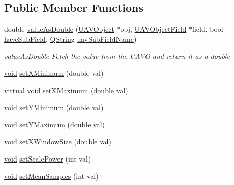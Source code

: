 \subsection*{\-Public \-Member \-Functions}
\begin{DoxyCompactItemize}
\item 
double \hyperlink{group___scope_plugin_ga7a54fec6758e8641d8baaefca4deddc9}{value\-As\-Double} (\hyperlink{class_u_a_v_object}{\-U\-A\-V\-Object} $\ast$obj, \hyperlink{class_u_a_v_object_field}{\-U\-A\-V\-Object\-Field} $\ast$field, bool \hyperlink{group___scope_plugin_ga75814d7f770a1a8348f39dc7ca4bdb8f}{have\-Sub\-Field}, \hyperlink{group___u_a_v_objects_plugin_gab9d252f49c333c94a72f97ce3105a32d}{\-Q\-String} \hyperlink{group___scope_plugin_ga22ac4a688fa35def44e941b82b0a0b60}{uav\-Sub\-Field\-Name})
\begin{DoxyCompactList}\small\item\em value\-As\-Double \-Fetch the value from the \-U\-A\-V\-O and return it as a double \end{DoxyCompactList}\item 
\hyperlink{group___u_a_v_objects_plugin_ga444cf2ff3f0ecbe028adce838d373f5c}{void} \hyperlink{group___scope_plugin_ga8352ce6b7eb9118afa04e021fbba40cc}{set\-X\-Minimum} (double val)
\item 
virtual \hyperlink{group___u_a_v_objects_plugin_ga444cf2ff3f0ecbe028adce838d373f5c}{void} \hyperlink{group___scope_plugin_ga3f195254ad44f888d45d763d819d4341}{set\-X\-Maximum} (double val)
\item 
\hyperlink{group___u_a_v_objects_plugin_ga444cf2ff3f0ecbe028adce838d373f5c}{void} \hyperlink{group___scope_plugin_ga74a63f7995ced2fd9c0fffbde542e75b}{set\-Y\-Minimum} (double val)
\item 
\hyperlink{group___u_a_v_objects_plugin_ga444cf2ff3f0ecbe028adce838d373f5c}{void} \hyperlink{group___scope_plugin_ga7dcfb9885435134bdde7c5006213afd8}{set\-Y\-Maximum} (double val)
\item 
\hyperlink{group___u_a_v_objects_plugin_ga444cf2ff3f0ecbe028adce838d373f5c}{void} \hyperlink{group___scope_plugin_ga35f3eec02d08ef7ab235fe297178c265}{set\-X\-Window\-Size} (double val)
\item 
\hyperlink{group___u_a_v_objects_plugin_ga444cf2ff3f0ecbe028adce838d373f5c}{void} \hyperlink{group___scope_plugin_ga44aceae690d2c2ffa80cd32788d30264}{set\-Scale\-Power} (int val)
\item 
\hyperlink{group___u_a_v_objects_plugin_ga444cf2ff3f0ecbe028adce838d373f5c}{void} \hyperlink{group___scope_plugin_ga2964b875a2d538d227778614df3fdebc}{set\-Mean\-Samples} (int val)

\end{DoxyCompactItemize}
